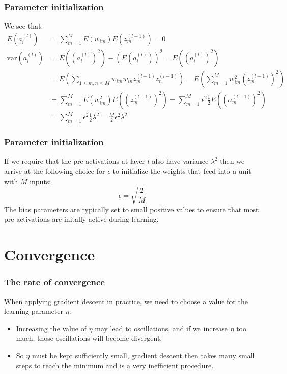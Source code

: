 \documentclass{beamer}
\begin{document}
\begin{frame}
    \frametitle{Parameter initialization}
    We see that:
    \begin{align*}
        E(a^{(l)}_{i})&=\sum_{m=1}^{M}E(w_{im})E(z^{(l-1)}_{m})=0 \\
        \mathrm{var}(a^{(l)}_{i})&=E((a^{(l)}_{i})^{2})-(E(a^{(l)}_{i}))^{2}=E((a^{(l)}_{i})^{2}) \\
        &=E(\sum_{1\le{}m,n\le{}M}w_{im}w_{in}z^{(l-1)}_{m}z^{(l-1)}_{n})=E(\sum_{m=1}^{M}w_{im}^{2}(z^{(l-1)}_{m})^{2}) \\
        &=\sum_{m=1}^{M}E(w_{im}^{2})E((z^{(l-1)}_{m})^{2})=\sum_{m=1}^{M}\epsilon^{2}\frac{1}{2}E((a^{(l-1)}_{m})^{2}) \\
        &=\sum_{m=1}^{M}\epsilon^{2}\frac{1}{2}\lambda^{2}=\frac{M}{2}\epsilon^{2}\lambda^{2}
    \end{align*}
\end{frame}

\begin{frame}
    \frametitle{Parameter initialization}
    If we require that the pre-activations at layer $l$ also have variance $\lambda^{2}$ then we arrive at the following choice for $\epsilon$ to initialize the weights that feed into a unit with $M$ inputs:
    \begin{equation*}
        \epsilon=\sqrt{\frac{2}{M}}
    \end{equation*}
    The bias parameters are typically set to small positive values to ensure that most pre-activations are initally active during learning.
\end{frame}

\section{Convergence}

\begin{frame}
    \frametitle{The rate of convergence}
    When applying gradient descent in practice, we need to choose a value for the learning parameter $\eta$:
    \begin{itemize}
        \item Increasing the value of $\eta$ may lead to oscillations, and if we increase $\eta$ too much, those oscillations will become divergent.
        \item So $\eta$ must be kept sufficiently small, gradient descent then takes many small steps to reach the minimum and is a very inefficient procedure.
    \end{itemize}
\end{frame}
\end{document}
